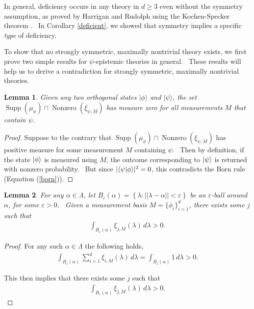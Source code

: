 \documentclass[letterpaper,12pt]{article}
\newtheorem{lem}{Lemma}
\newcommand{\ban}{\begin{eqnarray*}}
\newcommand{\ean}{\end{eqnarray*}}
\newcommand{\braket}[2]{\mbox{$ \langle #1 | #2 \rangle $}}
\newcommand{\ket}[1]{\mbox{$ | #1 \rangle $}}
\DeclareMathOperator{\supp}{Supp}
\DeclareMathOperator{\nz}{Nonzero}
\begin{document}
In general, deficiency occurs in any theory in $d\geq 3$ even without the
symmetry assumption, as proved by Harrigan and Rudolph \cite{hr} using the
Kochen-Specker theorem \cite{ks}. \ In Corollary \ref{deficient}, we showed
that symmetry implies a specific \emph{type} of deficiency.


To show that no strongly symmetric, maximally nontrivial theory exists, we first prove two simple
results for $\psi$-epistemic theories in general. \ These results will help us to derive a contradiction
for strongly symmetric, maximally nontrivial theories.

\begin{lem}
\label{orthogonal} Given any two orthogonal states $ | \phi \rangle $ and $%
 | \psi \rangle $, the set $\supp(\mu_{\phi})\cap \nz(\xi_{\psi,M})$ has
measure zero for all measurements $M$ that contain $\psi$.
\end{lem}

\begin{proof}
Suppose to the contrary that $\supp(\mu_{\phi})\cap \nz(\xi_{\psi,M})$ has positive measure for some measurement $M$ containing $\psi$. \ Then by definition, if the state $\ket{\phi}$ is measured using $M$, the outcome corresponding to $\ket{\psi}$ is returned with nonzero probability. \ But since $|\braket{\psi}{\phi}|^2=0$, this contradicts the Born rule (Equation (\ref{born})).
\end{proof}


\begin{lem}
\label{response} For any $\alpha\in\Lambda$, let $B_{\varepsilon}(\alpha)=\left%
\{\lambda:||\lambda-\alpha||<\varepsilon\right\}$ be an $\varepsilon$-ball around $
\alpha$, for some $\varepsilon>0$. \ Given a measurement basis $%
M=\{\phi_i\}_{i=1}^d$, there exists some $j$ such that
\begin{eqnarray}
\int_{B_\varepsilon(\alpha)} \xi_{j,M}(\lambda) \,d\lambda >0.
\end{eqnarray}
\end{lem}

\begin{proof}
For any such $\alpha\in\Lambda$ the following holds,
\ban \int_{B_\varepsilon(\alpha)} \sum_{i=1}^{d} \xi_{i,M}(\lambda)\,d\lambda =\int_{B_\varepsilon(\alpha)} 1\,d\lambda >0. \ean

\noindent This then implies that there exists some $j$ such that
\ban \int_{B_\varepsilon(\alpha)} \xi_{j,M}(\lambda) \,d\lambda >0. \ean
\end{proof}
\end{document}
